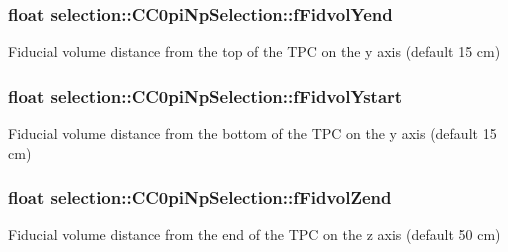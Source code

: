 \subsubsection[{\texorpdfstring{f\+Fidvol\+Yend}{fFidvolYend}}]{\setlength{\rightskip}{0pt plus 5cm}float selection\+::\+C\+C0pi\+Np\+Selection\+::f\+Fidvol\+Yend\hspace{0.3cm}{\ttfamily [private]}}\hypertarget{classselection_1_1CC0piNpSelection_a4732dc1091cb1881c741d57f999b5035}{}\label{classselection_1_1CC0piNpSelection_a4732dc1091cb1881c741d57f999b5035}
Fiducial volume distance from the top of the T\+PC on the y axis (default 15 cm) 
\subsubsection[{\texorpdfstring{f\+Fidvol\+Ystart}{fFidvolYstart}}]{\setlength{\rightskip}{0pt plus 5cm}float selection\+::\+C\+C0pi\+Np\+Selection\+::f\+Fidvol\+Ystart\hspace{0.3cm}{\ttfamily [private]}}\hypertarget{classselection_1_1CC0piNpSelection_ac59a66f695af8314018029e4480db16a}{}\label{classselection_1_1CC0piNpSelection_ac59a66f695af8314018029e4480db16a}
Fiducial volume distance from the bottom of the T\+PC on the y axis (default 15 cm) 
\subsubsection[{\texorpdfstring{f\+Fidvol\+Zend}{fFidvolZend}}]{\setlength{\rightskip}{0pt plus 5cm}float selection\+::\+C\+C0pi\+Np\+Selection\+::f\+Fidvol\+Zend\hspace{0.3cm}{\ttfamily [private]}}\hypertarget{classselection_1_1CC0piNpSelection_a9ac28bcb4ef95573d416dec35202b18e}{}\label{classselection_1_1CC0piNpSelection_a9ac28bcb4ef95573d416dec35202b18e}
Fiducial volume distance from the end of the T\+PC on the z axis (default 50 cm) 
